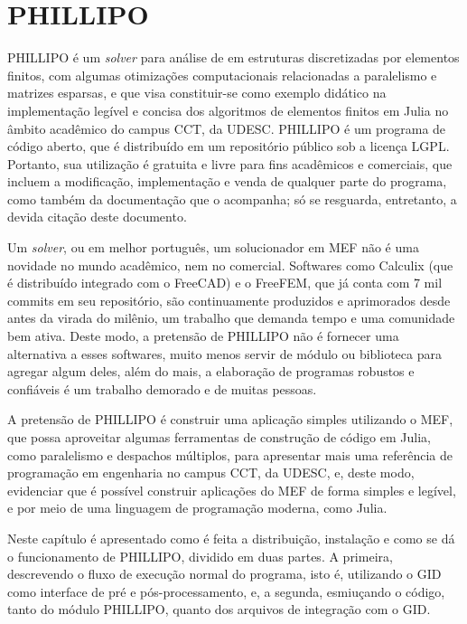

\chapter{PHILLIPO}

PHILLIPO é um \emph{solver} para análise de em estruturas discretizadas por elementos finitos, com algumas otimizações computacionais relacionadas a paralelismo e matrizes esparsas, e que visa constituir-se como exemplo didático na implementação legível e concisa dos algoritmos de elementos finitos em Julia no âmbito acadêmico do campus CCT, da UDESC. PHILLIPO é um programa de código aberto, que é distribuído em um repositório público\footnotemark[1]{} sob a licença LGPL\footnotemark[2]{}. Portanto, sua utilização é gratuita e livre para fins acadêmicos e comerciais, que incluem a modificação, implementação e venda de qualquer parte do programa, como também da documentação que o acompanha; só se resguarda, entretanto, a devida citação deste documento.

Um \emph{solver}, ou em melhor português, um solucionador em MEF não é uma novidade no mundo acadêmico, nem no comercial. Softwares como Calculix (que é distribuído integrado com o FreeCAD) e o FreeFEM, que já conta com 7 mil commits em seu repositório, são continuamente produzidos e aprimorados desde antes da virada do milênio, um trabalho que demanda tempo e uma comunidade bem ativa. Deste modo, a pretensão de PHILLIPO não é fornecer uma alternativa a esses softwares, muito menos servir de módulo ou biblioteca para agregar algum deles, além do mais, a elaboração de programas robustos e confiáveis é um trabalho demorado e de muitas pessoas.

A pretensão de PHILLIPO é construir uma aplicação simples utilizando o MEF, que possa aproveitar algumas ferramentas de construção de código em Julia, como paralelismo e despachos múltiplos, para apresentar mais uma referência de programação em engenharia no campus CCT, da UDESC, e, deste modo, evidenciar que é possível construir aplicações do MEF de forma simples e legível, e por meio de uma linguagem de programação moderna, como Julia.

Neste capítulo é apresentado como é feita a distribuição, instalação e como se dá o funcionamento de PHILLIPO, dividido em duas partes. A primeira, descrevendo o fluxo de execução normal do programa, isto é, utilizando o GID como interface de pré e pós-processamento, e, a segunda, esmiuçando o código, tanto do módulo PHILLIPO, quanto dos arquivos de integração com o GID.

